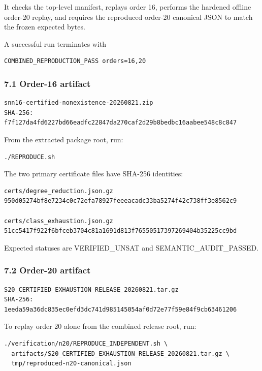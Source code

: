 \documentclass[
  english,
  11pt,
  a4paper,
]{article}
\newcounter{none} %
\begin{document}
It checks the top-level manifest, replays order 16, performs the
hardened offline order-20 replay, and requires the reproduced order-20
canonical JSON to match the frozen expected bytes.

A successful run terminates with

\begin{verbatim}
COMBINED_REPRODUCTION_PASS orders=16,20
\end{verbatim}

\subsubsection{7.1 Order-16 artifact}\label{order-16-artifact}

\begin{verbatim}
snn16-certified-nonexistence-20260821.zip
SHA-256: f7f127da4fd6227bd66eadfc22847da270caf2d29b8bedbc16aabee548c8c847
\end{verbatim}

From the extracted package root, run:

\begin{verbatim}
./REPRODUCE.sh
\end{verbatim}

The two primary certificate files have SHA-256 identities:

\begin{verbatim}
certs/degree_reduction.json.gz
950d05274bf8e7234c0c72efa78927feeeacadc33ba5274f42c738ff3e8562c9

certs/class_exhaustion.json.gz
51cc5417f922f6bfceb3704c81a1691d813f76550517397269404b35225cc9bd
\end{verbatim}

Expected statuses are VERIFIED\_UNSAT and SEMANTIC\_AUDIT\_PASSED.

\subsubsection{7.2 Order-20 artifact}\label{order-20-artifact}

\begin{verbatim}
S20_CERTIFIED_EXHAUSTION_RELEASE_20260821.tar.gz
SHA-256: 1eeda59a36dc835ec0efd3dc741d985145054af0d72e77f59e84f9cb63461206
\end{verbatim}

To replay order 20 alone from the combined release root, run:

\begin{verbatim}
./verification/n20/REPRODUCE_INDEPENDENT.sh \
  artifacts/S20_CERTIFIED_EXHAUSTION_RELEASE_20260821.tar.gz \
  tmp/reproduced-n20-canonical.json
\end{verbatim}
\end{document}
